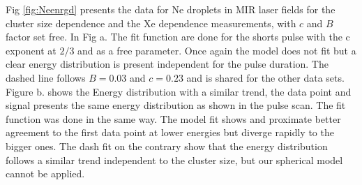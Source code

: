 Fig \ref{fig:Neenrgd} presents the data for Ne droplets in MIR laser fields for the cluster size dependence and the Xe dependence measurements, with $c$ and $B$ factor set free. In Fig a. The fit function are done for the shorts pulse with the c exponent at $2/3$ and as a free parameter. Once again the model does not fit but a clear energy distribution is present independent for the pulse duration. The dashed line follows $B=0.03$ and $c=0.23$ and is shared for the other data sets. 
Figure b. shows the Energy distribution with a similar trend, the data point and signal presents the same energy distribution as shown in the pulse scan. The fit function was done in the same way. The model fit shows and proximate better agreement to the first data point at lower energies but diverge rapidly to the bigger ones. The dash fit on the contrary show that the energy distribution follows a similar trend independent to the cluster size, but our spherical model cannot be applied.

